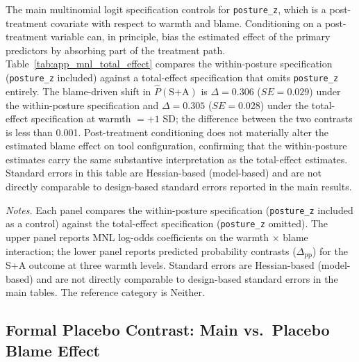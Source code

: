 \documentclass[12pt,letterpaper]{article}
\begin{document}
The main multinomial logit specification controls for \texttt{posture\_z}, which is a post-treatment covariate with respect to warmth and blame. Conditioning on a post-treatment variable can, in principle, bias the estimated effect of the primary predictors by absorbing part of the treatment path. Table~\ref{tab:app_mnl_total_effect} compares the within-posture specification (\texttt{posture\_z} included) against a total-effect specification that omits \texttt{posture\_z} entirely. The blame-driven shift in $\hat{P}(\text{S+A})$ is $\Delta = 0.306$ ($SE = 0.029$) under the within-posture specification and $\Delta = 0.305$ ($SE = 0.028$) under the total-effect specification at warmth $= +1$ SD; the difference between the two contrasts is less than 0.001. Post-treatment conditioning does not materially alter the estimated blame effect on tool configuration, confirming that the within-posture estimates carry the same substantive interpretation as the total-effect estimates. Standard errors in this table are Hessian-based (model-based) and are not directly comparable to design-based standard errors reported in the main results.

\begin{table}[htbp]
\centering
\small
\caption{Post-Treatment Sensitivity: Within-Posture vs.\ Total-Effect MNL Specification}
\label{tab:app_mnl_total_effect}
\scriptsize

\par\vspace{0.5ex}
{\footnotesize\textit{Notes.} Each panel compares the within-posture specification (\texttt{posture\_z} included as a control) against the total-effect specification (\texttt{posture\_z} omitted). The upper panel reports MNL log-odds coefficients on the warmth $\times$ blame interaction; the lower panel reports predicted probability contrasts ($\Delta_{\text{pp}}$) for the S+A outcome at three warmth levels. Standard errors are Hessian-based (model-based) and are not directly comparable to design-based standard errors in the main tables. The reference category is Neither.}
\end{table}

\subsection{Formal Placebo Contrast: Main vs.\ Placebo Blame Effect}
\label{sec:app_placebo_contrast}
\end{document}
